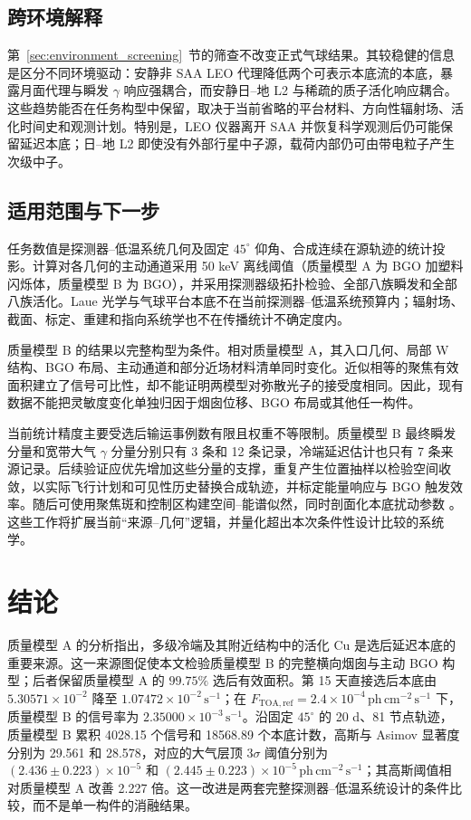\documentclass[11pt]{article}
\newcommand{\phcms}{\,\mathrm{ph\,cm^{-2}\,s^{-1}}}
\newcommand{\cps}{\,\mathrm{s^{-1}}}
\newcommand{\ftoaref}{F_{\mathrm{TOA,ref}}}
\begin{document}
\subsection{跨环境解释}

第~\ref{sec:environment_screening}~节的筛查不改变正式气球结果。其较稳健的信息是区分不同环境驱动：安静非 SAA LEO 代理降低两个可表示本底流的本底，暴露月面代理与瞬发 $\gamma$ 响应强耦合，而安静日--地 L2 与稀疏的质子活化响应耦合。这些趋势能否在任务构型中保留，取决于当前省略的平台材料、方向性辐射场、活化时间史和观测计划。特别是，LEO 仪器离开 SAA 并恢复科学观测后仍可能保留延迟本底；日--地 L2 即使没有外部行星中子源，载荷内部仍可由带电粒子产生次级中子。

\subsection{适用范围与下一步}
\label{subsec:limitations}

任务数值是探测器--低温系统几何及固定 $45^\circ$ 仰角、合成连续在源轨迹的统计投影。计算对各几何的主动通道采用 50 keV 离线阈值（质量模型 A 为 BGO 加塑料闪烁体，质量模型 B 为 BGO），并采用探测器级拓扑检验、全部八族瞬发和全部八族活化。Laue 光学与气球平台本底不在当前探测器--低温系统预算内；辐射场、截面、标定、重建和指向系统学也不在传播统计不确定度内。

质量模型 B 的结果以完整构型为条件。相对质量模型 A，其入口几何、局部 W 结构、BGO 布局、主动通道和部分近场材料清单同时变化。近似相等的聚焦有效面积建立了信号可比性，却不能证明两模型对弥散光子的接受度相同。因此，现有数据不能把灵敏度变化单独归因于烟囱位移、BGO 布局或其他任一构件。

当前统计精度主要受选后输运事例数有限且权重不等限制。质量模型 B 最终瞬发分量和宽带大气 $\gamma$ 分量分别只有 3 条和 12 条记录，冷端延迟估计也只有 7 条来源记录。后续验证应优先增加这些分量的支撑，重复产生位置抽样以检验空间收敛，以实际飞行计划和可见性历史替换合成轨迹，并标定能量响应与 BGO 触发效率。随后可使用聚焦斑和控制区构建空间--能谱似然，同时剖面化本底扰动参数 \cite{Cowan2011}。这些工作将扩展当前“来源--几何”逻辑，并量化超出本次条件性设计比较的系统学。

\section{结论}
\label{sec:conclusions}

质量模型 A 的分析指出，多级冷端及其附近结构中的活化 Cu 是选后延迟本底的重要来源。这一来源图促使本文检验质量模型 B 的完整横向烟囱与主动 BGO 构型；后者保留质量模型 A 的 $99.75\%$ 选后有效面积。第 15 天直接选后本底由 $5.30571\times10^{-2}$ 降至 $1.07472\times10^{-2}\cps$；在 $\ftoaref=2.4\times10^{-4}\phcms$ 下，质量模型 B 的信号率为 $2.35000\times10^{-3}\cps$。沿固定 $45^\circ$ 的 20 d、81 节点轨迹，质量模型 B 累积 4028.15 个信号和 18568.89 个本底计数，高斯与 Asimov 显著度分别为 29.561 和 28.578，对应的大气层顶 $3\sigma$ 阈值分别为 $(2.436\pm0.223)\times10^{-5}$ 和 $(2.445\pm0.223)\times10^{-5}\phcms$；其高斯阈值相对质量模型 A 改善 2.227 倍。这一改进是两套完整探测器--低温系统设计的条件比较，而不是单一构件的消融结果。
\end{document}
